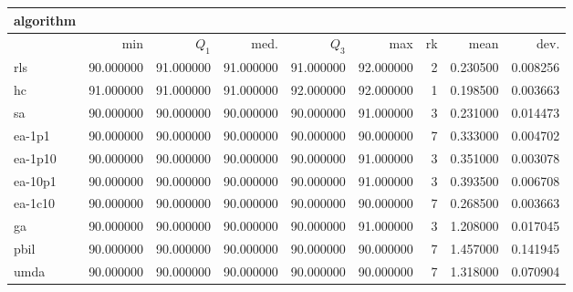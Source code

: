 \begin{tabular}{@{}l*{5}{>{{}}N{3}{0}}>{{}}N{2}{0}N{1}{3}N{1}{3}@{}}
\toprule
{algorithm} &  &  \\
\midrule
& {min} & {$Q_1$} & {med.} & {$Q_3$} & {max} & {rk} & {mean} & {dev.} \\
\midrule
rls & 90.000000 & {\color{blue}} 91.000000 & {\color{blue}} 91.000000 & 91.000000 & {\color{blue}} 92.000000 & 2 & 0.230500 & 0.008256 \\
 hc & {\color{blue}} 91.000000 & {\color{blue}} 91.000000 & {\color{blue}} 91.000000 & {\color{blue}} 92.000000 & {\color{blue}} 92.000000 & 1 & 0.198500 & 0.003663 \\
 sa & 90.000000 & 90.000000 & 90.000000 & 90.000000 & 91.000000 & 3 & 0.231000 & 0.014473 \\
 ea-1p1 & 90.000000 & 90.000000 & 90.000000 & 90.000000 & 90.000000 & 7 & 0.333000 & 0.004702 \\
 ea-1p10 & 90.000000 & 90.000000 & 90.000000 & 90.000000 & 91.000000 & 3 & 0.351000 & 0.003078 \\
 ea-10p1 & 90.000000 & 90.000000 & 90.000000 & 90.000000 & 91.000000 & 3 & 0.393500 & 0.006708 \\
 ea-1c10 & 90.000000 & 90.000000 & 90.000000 & 90.000000 & 90.000000 & 7 & 0.268500 & 0.003663 \\
 ga & 90.000000 & 90.000000 & 90.000000 & 90.000000 & 91.000000 & 3 & 1.208000 & 0.017045 \\
 pbil & 90.000000 & 90.000000 & 90.000000 & 90.000000 & 90.000000 & 7 & 1.457000 & 0.141945 \\
 umda & 90.000000 & 90.000000 & 90.000000 & 90.000000 & 90.000000 & 7 & 1.318000 & 0.070904 \\
 \bottomrule
\end{tabular}
